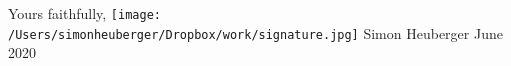 \noindent Yours faithfully, 
\newline \newline \texttt{[image: /Users/simonheuberger/Dropbox/work/signature.jpg]}
\newline Simon Heuberger
\newline June 2020












